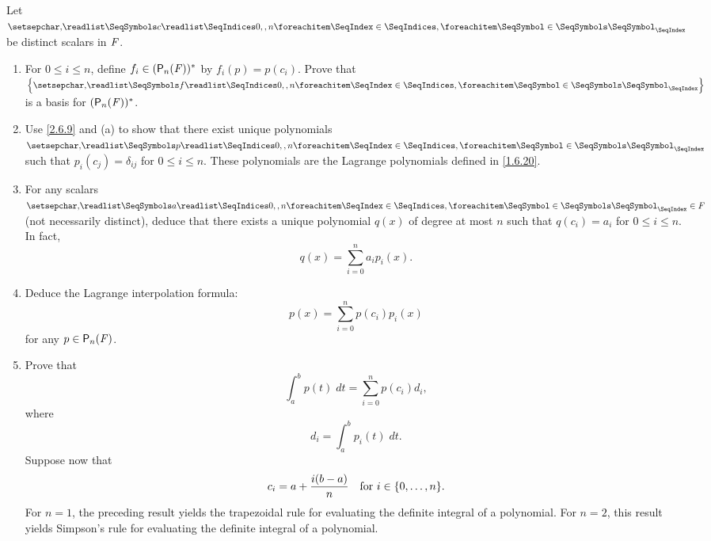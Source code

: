 \begin{ex}\label{ex:2.6.10}
  Let \(\seq{c}{0,,n}\) be distinct scalars in \(\mathit{F}\).
  \begin{enumerate}
    \item For \(0 \leq i \leq n\), define \(f_i \in (\ps[n]{\F})^*\) by \(f_i(p) = p(c_i)\).
          Prove that \(\set{\seq{f}{0,,n}}\) is a basis for \((\ps[n]{\F})^*\).
    \item Use \cref{2.6.9} and (a) to show that there exist unique polynomials \(\seq{p}{0,,n}\) such that \(p_i(c_j) = \delta_{i j}\) for \(0 \leq i \leq n\).
          These polynomials are the Lagrange polynomials defined in \cref{1.6.20}.
    \item For any scalars \(\seq{a}{0,,n} \in \F\) (not necessarily distinct), deduce that there exists a unique polynomial \(q(x)\) of degree at most \(n\) such that \(q(c_i) = a_i\) for \(0 \leq i \leq n\).
          In fact,
          \[
            q(x) = \sum_{i = 0}^n a_i p_i(x).
          \]
    \item Deduce the Lagrange interpolation formula:
          \[
            p(x) = \sum_{i = 0}^n p(c_i) p_i(x)
          \]
          for any \(p \in \ps[n]{\F}\).
    \item Prove that
          \[
            \int_a^b p(t) \; dt = \sum_{i = 0}^n p(c_i) d_i,
          \]
          where
          \[
            d_i = \int_a^b p_i(t) \; dt.
          \]
          Suppose now that
          \[
            c_i = a + \frac{i (b - a)}{n} \quad \text{for } i \in \set{0, \dots, n}.
          \]
          For \(n = 1\), the preceding result yields the trapezoidal rule for evaluating the definite integral of a polynomial.
          For \(n = 2\), this result yields Simpson's rule for evaluating the definite integral of a polynomial.
  \end{enumerate}
\end{ex}


